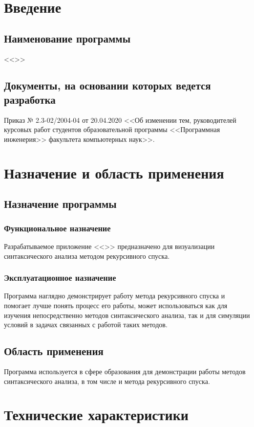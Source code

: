 \documentclass[a4paper,12pt]{article}
\begin{document}
  \CRTpreamble

  \section{Введение}
  \subsection{Наименование программы}
  <<\CRTname>>

  \subsection{Документы, на основании которых ведется разработка}
  Приказ № 2.3-02/2004-04 от 20.04.2020 <<Об изменении тем, руководителей курсовых работ студентов образовательной программы
  <<Программная инженерия>> факультета компьютерных наук>>.

  \newpage
  \section{Назначение и область применения}
  \subsection{Назначение программы}
  \subsubsection{Функциональное назначение}
  Разрабатываемое приложение <<\CRTname>> предназначено для визуализации синтаксического анализа методом рекурсивного спуска.
  \subsubsection{Эксплуатационное назначение}
  Программа наглядно демонстрирует работу метода рекурсивного спуска и помогает лучше понять процесс его работы,
  может использоваться как для изучения непосредственно методов синтаксического анализа,
  так и для симуляции условий в задачах связанных с работой таких методов.
  \subsection{Область применения}
  Программа используется в сфере образования для демонстрации работы
  методов синтаксического анализа, в том числе и метода рекурсивного спуска.

  \newpage
  \section{Технические характеристики}
\end{document}
